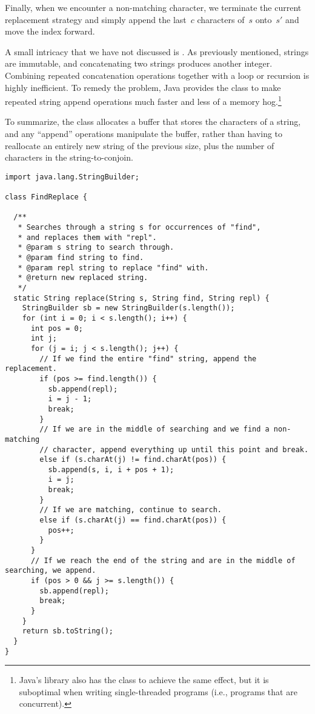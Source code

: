 Finally, when we encounter a non-matching character, we terminate the current replacement strategy and simply append the last~$c$ characters of~$s$ onto~$s'$ and move the index forward.

A small intricacy that we have not discussed is .
As previously mentioned, strings are immutable, and concatenating two strings produces another integer.
Combining repeated concatenation operations together with a loop or recursion is highly inefficient.
To remedy the problem, Java provides the  class to make repeated string append operations much faster and less of a memory hog.\footnote{Java's library also has the  class to achieve the same effect, but it is suboptimal when writing single-threaded programs (i.e., programs that are concurrent).}

To summarize, the  class allocates a buffer that stores the characters of a string, and any ``append'' operations manipulate the buffer, rather than having to reallocate an entirely new string of the previous size, plus the number of characters in the string-to-conjoin.

\newpage
\begin{lstlisting}[language=MyJava]
import java.lang.StringBuilder;

class FindReplace {

  /**
   * Searches through a string s for occurrences of "find", 
   * and replaces them with "repl".
   * @param s string to search through.
   * @param find string to find.
   * @param repl string to replace "find" with.
   * @return new replaced string.
   */
  static String replace(String s, String find, String repl) {
    StringBuilder sb = new StringBuilder(s.length());
    for (int i = 0; i < s.length(); i++) {
      int pos = 0;
      int j;
      for (j = i; j < s.length(); j++) {
        // If we find the entire "find" string, append the replacement.
        if (pos >= find.length()) {
          sb.append(repl);
          i = j - 1;
          break;
        }
        // If we are in the middle of searching and we find a non-matching
        // character, append everything up until this point and break.
        else if (s.charAt(j) != find.charAt(pos)) {
          sb.append(s, i, i + pos + 1);
          i = j;
          break;
        }
        // If we are matching, continue to search.
        else if (s.charAt(j) == find.charAt(pos)) {
          pos++;
        }
      }
      // If we reach the end of the string and are in the middle of searching, we append.
      if (pos > 0 && j >= s.length()) {
        sb.append(repl);
        break;
      }
    }
    return sb.toString();
  }
}
\end{lstlisting}

